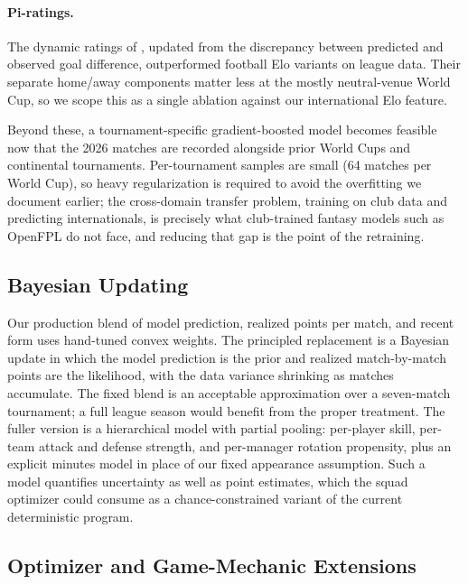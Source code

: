 \paragraph{Pi-ratings.} The dynamic ratings of
\citet{constantinou2013pi}, updated from the discrepancy between
predicted and observed goal difference, outperformed football Elo
variants \citep{hvattum2010using} on league data. Their separate
home/away components matter less at the mostly neutral-venue World
Cup, so we scope this as a single ablation against our international
Elo feature.

Beyond these, a tournament-specific gradient-boosted model becomes
feasible now that the 2026 matches are recorded alongside prior World
Cups and continental tournaments. Per-tournament samples are small
(64 matches per World Cup), so heavy regularization is required to
avoid the overfitting we document earlier; the cross-domain transfer
problem, training on club data and predicting internationals, is
precisely what club-trained fantasy models such as OpenFPL
\citep{groos2025openfpl} do not face, and reducing that gap is the
point of the retraining.

\subsection{Bayesian Updating}
\label{sec:future-bayesian}

Our production blend of model prediction, realized points per match,
and recent form uses hand-tuned convex weights. The principled
replacement is a Bayesian update in which the model prediction is the
prior and realized match-by-match points are the likelihood, with the
data variance shrinking as matches accumulate. The fixed blend is an
acceptable approximation over a seven-match tournament; a full league
season would benefit from the proper treatment. The fuller version is
a hierarchical model with partial pooling: per-player skill, per-team
attack and defense strength, and per-manager rotation propensity, plus
an explicit minutes model in place of our fixed appearance assumption.
Such a model quantifies uncertainty as well as point estimates, which
the squad optimizer could consume as a chance-constrained variant of
the current deterministic program.

\subsection{Optimizer and Game-Mechanic Extensions}
\label{sec:future-optimizer}

